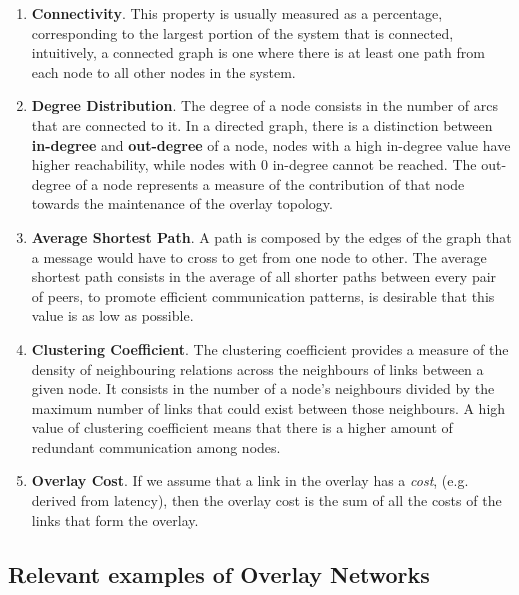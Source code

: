 \begin{enumerate}
    
    \item \textbf{Connectivity}. This property is usually measured as a percentage, corresponding to the largest portion of the system that is connected, intuitively, a connected graph is one where there is at least one path from each node to all other nodes in the system.
    
    \item \textbf{Degree Distribution}. The degree of a node consists in the number of arcs that are connected to it. In a directed graph, there is a distinction between \textbf{in-degree} and \textbf{out-degree} of a node, nodes with a high in-degree value have higher reachability, while nodes with 0 in-degree cannot be reached. The out-degree of a node represents a measure of the contribution of that node towards the maintenance of the overlay topology.
    
    \item \textbf{Average Shortest Path}. A path is composed by the edges of the graph that a message would have to cross to get from one node to other. The average shortest path consists in the average of all shorter paths between every pair of peers, to promote efficient communication patterns, is desirable that this value is as low as possible.
    
    \item \textbf{Clustering Coefficient}. The clustering coefficient provides a measure of the density of neighbouring relations across the neighbours of links between a given node. It consists in the number of a node's neighbours divided by the maximum number of links that could exist between those neighbours. A high value of clustering coefficient means that there is a higher amount of redundant communication among nodes.
    
    \item \textbf{Overlay Cost}. If we assume that a link in the overlay has a \textit{cost}, (e.g. derived from latency), then the overlay cost is the sum of all the costs of the links that form the overlay. 
    
\end{enumerate}

\subsection{Relevant examples of Overlay Networks}

